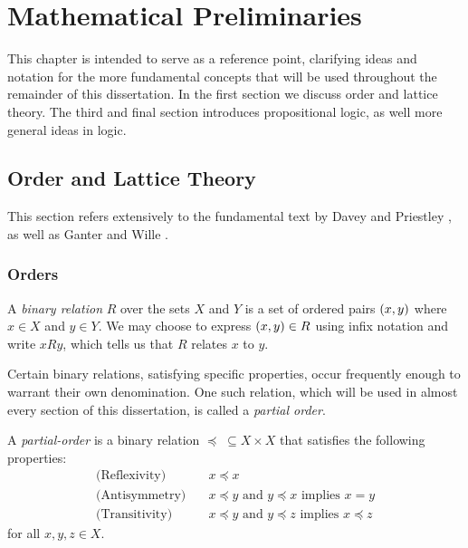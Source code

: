 \chapter{Mathematical Preliminaries}
\label{chapter:mathematical-preliminaries}

This chapter is intended to serve as a reference point, clarifying ideas and notation for the more fundamental concepts that will be used throughout the remainder of this dissertation. In the first section we discuss order and lattice theory. The third and final section introduces propositional logic, as well more general ideas in logic.

\section{Order and Lattice Theory}
\label{section:order-theory}

This section refers extensively to the fundamental text by Davey and Priestley \cite{davey2002introduction}, as well as Ganter and Wille \cite{ganter1999formal}.

\subsection{Orders}
\label{subsection:orders}

A \textit{binary relation}  $R$ over the sets $X$ and $Y$ is a set of ordered pairs $(x,y)$ where $x \in X$ and $y \in Y$. We may choose to express $(x,y) \in R$ using infix notation and write $xRy$, which tells us that $R$ relates $x$ to $y$.

Certain binary relations, satisfying specific properties, occur frequently enough to warrant their own denomination. One such relation, which will be used in almost every section of this dissertation, is called a \textit{partial order}.

\begin{definition}
  \label{definition:partial-order}
  A \textit{partial-order}  is a binary relation $\preceq \; \subseteq X \times X$ that satisfies the following properties:
  \begin{align}
    \text{(Reflexivity)} \quad & x \preceq x \\
    \text{(Antisymmetry)} \quad & x \preceq y \text{ and } y \preceq x \text{ implies } x = y \\
    \text{(Transitivity)} \quad & x \preceq y \text{ and } y \preceq z \text{ implies } x \preceq z
  \end{align}
  for all $x,y,z \in X$.
\end{definition}

